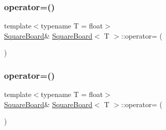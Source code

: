 \mbox{\label{classSquareBoard_a354794a6de9edec8c771ca49dd315acf}} 
\subsubsection{\texorpdfstring{operator=()}{operator=()}\hspace{0.1cm}{\footnotesize\ttfamily [2/4]}}
{\footnotesize\ttfamily template$<$typename T  = float$>$ \\
\mbox{\hyperlink{classSquareBoard}{Square\+Board}}\& \mbox{\hyperlink{classSquareBoard}{Square\+Board}}$<$ T $>$\+::operator= (\begin{DoxyParamCaption}\item[{\mbox{\hyperlink{classSquareBoard}{Square\+Board}}$<$ T $>$ \&\&}]{ }\end{DoxyParamCaption})\hspace{0.3cm}{\ttfamily [default]}}

\mbox{\label{classSquareBoard_a15fd0ca02b5be393b75228123be1d2c8}} 
\subsubsection{\texorpdfstring{operator=()}{operator=()}\hspace{0.1cm}{\footnotesize\ttfamily [3/4]}}
{\footnotesize\ttfamily template$<$typename T  = float$>$ \\
\mbox{\hyperlink{classSquareBoard}{Square\+Board}}\& \mbox{\hyperlink{classSquareBoard}{Square\+Board}}$<$ T $>$\+::operator= (\begin{DoxyParamCaption}\item[{const \mbox{\hyperlink{classSquareBoard}{Square\+Board}}$<$ T $>$ \&}]{ }\end{DoxyParamCaption})\hspace{0.3cm}{\ttfamily [default]}}

\mbox{\label{classSquareBoard_a15fd0ca02b5be393b75228123be1d2c8}} 
